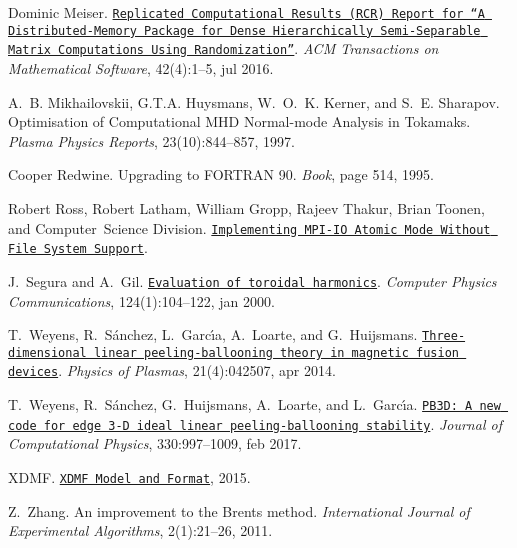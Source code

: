 \begin{DoxyDescription}
\item[\label{_CITEREF_Meiser2016}%
\mbox{[}9\mbox{]}]Dominic Meiser. \href{http://dl.acm.org/citation.cfm?doid=2956571.2929907}{\tt Replicated Computational Results (R\+CR) Report for “A Distributed-\/\+Memory Package for Dense Hierarchically Semi-\/\+Separable Matrix Computations Using Randomization”}. {\itshape A\+CM Transactions on Mathematical Software}, 42(4)\+:1--5, jul 2016. 


\item[\label{_CITEREF_mikhailovskii1997optimization}%
\mbox{[}10\mbox{]}]A.~B. Mikhailovskii, G.\+T.\+A. Huysmans, W.~O.~K. Kerner, and S.~E. Sharapov. Optimisation of Computational M\+HD Normal-\/mode Analysis in Tokamaks. {\itshape Plasma Physics Reports}, 23(10)\+:844--857, 1997.


\item[\label{_CITEREF_RedwineF90}%
\mbox{[}11\mbox{]}]Cooper Redwine. Upgrading to F\+O\+R\+T\+R\+AN 90. {\itshape Book}, page 514, 1995. 


\item[\label{_CITEREF_RossAtomicIO}%
\mbox{[}12\mbox{]}]Robert Ross, Robert Latham, William Gropp, Rajeev Thakur, Brian Toonen, and Computer~Science Division. \href{http://www.mcs.anl.gov/~thakur/papers/atomic-mode.pdf}{\tt Implementing M\+P\+I-\/\+IO Atomic Mode Without File System Support}.


\item[\label{_CITEREF_Segura2000}%
\mbox{[}13\mbox{]}]J.~Segura and A.~Gil. \href{http://linkinghub.elsevier.com/retrieve/pii/S0010465599004282
  https://ptp.jinr.ru/programs/cpc_ind8/ADKV.html
  http://cpc.cs.qub.ac.uk/summaries/ADKV_v1_0.html}{\tt Evaluation of toroidal harmonics}. {\itshape Computer Physics Communications}, 124(1)\+:104--122, jan 2000. 


\item[\label{_CITEREF_weyens2014theory}%
\mbox{[}14\mbox{]}]T.~Weyens, R.~S\'{a}nchez, L.~Garc\'{\i}a, A.~Loarte, and G.~Huijsmans. \href{http://aip.scitation.org/doi/10.1063/1.4871859}{\tt Three-\/dimensional linear peeling-\/ballooning theory in magnetic fusion devices}. {\itshape Physics of Plasmas}, 21(4)\+:042507, apr 2014. 


\item[\label{_CITEREF_Weyens2017PB3D}%
\mbox{[}15\mbox{]}]T.~Weyens, R.~S\'{a}nchez, G.~Huijsmans, A.~Loarte, and L.~Garc\'{\i}a. \href{http://linkinghub.elsevier.com/retrieve/pii/S0021999116305629}{\tt P\+B3\+D\+: A new code for edge 3-\/D ideal linear peeling-\/ballooning stability}. {\itshape Journal of Computational Physics}, 330\+:997--1009, feb 2017. 


\item[\label{_CITEREF_xdmf}%
\mbox{[}16\mbox{]}]X\+D\+MF. \href{http://www.xdmf.org/index.php/XDMF_Model_and_Format}{\tt X\+D\+MF Model and Format}, 2015.


\item[\label{_CITEREF_zhang2011improvement}%
\mbox{[}17\mbox{]}]Z.~Zhang. An improvement to the Brent\textquotesingle{}s method. {\itshape International Journal of Experimental Algorithms}, 2(1)\+:21--26, 2011.


\end{DoxyDescription}